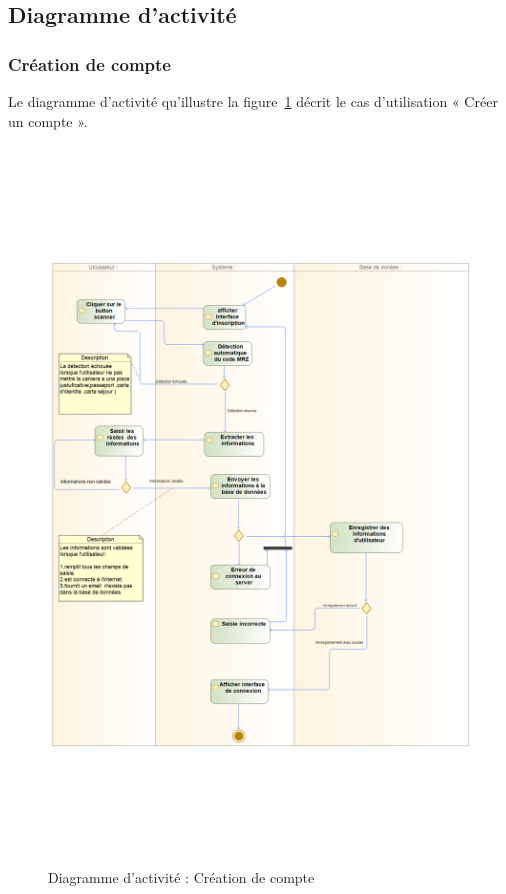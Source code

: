 \subsection{Diagramme d’activité}
\subsubsection{Création de compte}
Le diagramme d’activité qu’illustre la figure~\ref{activiteCompte} décrit le cas d’utilisation « Créer un compte ».
\begin{figure}[h!]
	\includegraphics[width=18cm, height=19cm]{./Template LaTeX/Images/ins_act.png}
\caption{Diagramme d’activité : Création de compte}
\label{activiteCompte}

\end{figure}
\newpage
